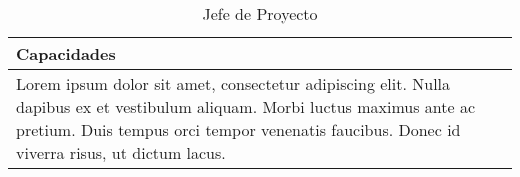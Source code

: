 \begin{table}[H]
\begin{center}
\begin{tabular}{p{}}
\hline \hline
\textbf{Capacidades}  \\
\hline
Lorem ipsum dolor sit amet, consectetur adipiscing elit. Nulla dapibus ex et vestibulum aliquam. Morbi luctus maximus ante ac pretium. Duis tempus orci tempor venenatis faucibus. Donec id viverra risus, ut dictum lacus. \\
\hline \hline
\end{tabular}
\caption{Jefe de Proyecto}
\label{tab:jefeDeProyecto}
\end{center}
\end{table}
